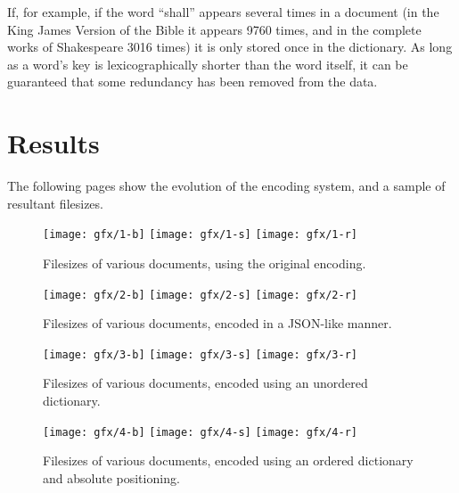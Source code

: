 If, for example, if the word ``shall'' appears several times in a document (in the King James Version of the Bible it appears 9760 times, and in the complete works of Shakespeare 3016 times) it is only stored once in the dictionary. As long as a word's key is lexicographically shorter than the word itself, it can be guaranteed that some redundancy has been removed from the data.


\section{Results}

The following pages show the evolution of the encoding system, and a sample of resultant filesizes.


\begin{figure}
  \begin{center}
  \texttt{[image: gfx/1-b]}
  \texttt{[image: gfx/1-s]}
  \texttt{[image: gfx/1-r]}
  \end{center}
  \caption[Filesizes of documents in original encoding]{Filesizes of various documents, using the original encoding.}
  \label{fig:size-orig}
\end{figure}



\begin{figure}
  \begin{center}
  \texttt{[image: gfx/2-b]}
  \texttt{[image: gfx/2-s]}
  \texttt{[image: gfx/2-r]}
  \end{center}
  \caption[Filesizes of documents in JSONified encoding]{Filesizes of various documents, encoded in a JSON-like manner.}
  \label{fig:size-json}
\end{figure}



\begin{figure}
  \begin{center}
  \texttt{[image: gfx/3-b]}
  \texttt{[image: gfx/3-s]}
  \texttt{[image: gfx/3-r]}
  \end{center}
  \caption[Filesizes of documents with an unordered dictionary]{Filesizes of various documents, encoded using an unordered dictionary.}
  \label{fig:size-unord}
\end{figure}



\begin{figure}
  \begin{center}
  \texttt{[image: gfx/4-b]}
  \texttt{[image: gfx/4-s]}
  \texttt{[image: gfx/4-r]}
  \end{center}
  \caption[Filesizes of documents with an ordered dictionary]{Filesizes of various documents, encoded using an ordered dictionary and absolute positioning.}
  \label{fig:size-ord}
\end{figure}



